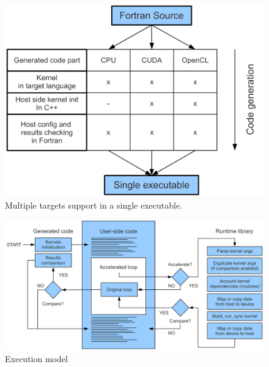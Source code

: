 \documentclass[a4,12pt]{article}
\begin{document}
\begin{figure}
\centering
\includegraphics[scale=0.5]{figures/portability.pdf}
\caption{Multiple targets support in a single executable.}
\label{fig:portability}
\end{figure}

\begin{figure}
\centering
\includegraphics[scale=0.4]{figures/execution.pdf}
\caption{Execution model}
\label{fig:execution}
\end{figure}
\end{document}
